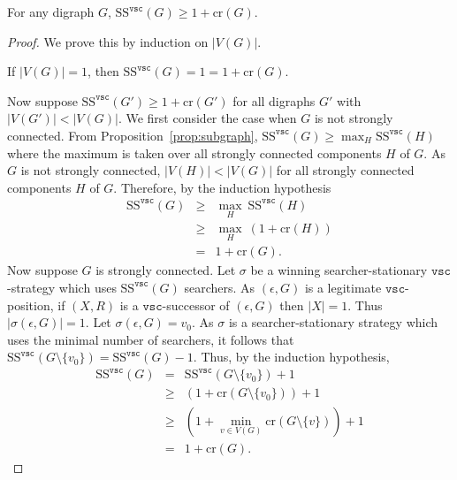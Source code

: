 \documentclass{llncs}
\newcommand{\cycr}[1]{\textrm{cr}(#1)}
\newcommand{\sstat}[1]{\textrm{SS}^{#1}}
\newcommand{\vscvar}{\texttt{vsc}}
\begin{document}
\begin{lemma}  
For any digraph $G$, $\sstat{\vscvar}(G) \geq 1+\cycr{G}$.
\end{lemma}
\begin{proof}
We prove this by induction on $|V(G)|$.

If $|V(G)|=1$, then $\sstat{\vscvar}(G) = 1 = 1 + \cycr{G}$. 

Now suppose $\sstat{\vscvar}(G') \geq 1+\cycr{G'}$ for all digraphs $G'$ with $|V(G')| < |V(G)|$.
We first consider the case when $G$ is not strongly connected.  From Proposition~\ref{prop:subgraph}, $\sstat{\vscvar}(G) \geq \max_H \sstat{\vscvar}(H)$ where the maximum is taken over all strongly connected components $H$ of $G$.  As $G$ is not strongly connected, $|V(H)| < |V(G)|$ for all strongly connected components $H$ of $G$.  Therefore, by the induction hypothesis
\begin{eqnarray*}
\sstat{\vscvar}(G) &\geq& \max_H \:\sstat{\vscvar}(H)\\
&\geq& \max_H \:(1+ \cycr{H})\\
&=& 1 + \cycr{G}.
\end{eqnarray*}
Now suppose $G$ is strongly connected.  Let $\sigma$ be a winning searcher-stationary $\vscvar$-strategy which uses $\sstat{\vscvar}(G)$ searchers.  As $(\epsilon, G)$ is a legitimate $\vscvar$-position, if $(X,R)$ is a  $\vscvar$-successor of $(\epsilon, G)$ then $|X| = 1$.  Thus $|\sigma(\epsilon, G)| = 1$.  Let $\sigma(\epsilon,G) = v_0$.  As $\sigma$ is a searcher-stationary strategy which uses the minimal number of searchers, it follows that $\sstat{\vscvar}(G\setminus \{v_0\}) = \sstat{\vscvar}(G) - 1$.  Thus, by the induction hypothesis,
\begin{eqnarray*}
\sstat{\vscvar}(G) & = & \sstat{\vscvar}(G\setminus \{v_0\}) + 1\\
&\geq& (1+ \cycr{G\setminus \{v_0\}})+1\\
&\geq & (1 + \min_{v \in V(G)}\cycr{G\setminus \{v\}})+1\\
& = & 1 + \cycr{G}.
\end{eqnarray*}
\end{proof}
\end{document}

